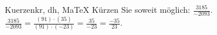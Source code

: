 \begin{MAufgabe}{Kuerzen}{kr, dh, MaTeX}
K\"urzen Sie soweit m\"oglich: $\frac{3185}{-2093}$.\\ 
\ifLsg\MLoesung
\quad $\frac{3185}{-2093}=\frac{(91)\cdot(35)}{(91)\cdot(-23)}=\frac{35}{-23}=\frac{-35}{23}$.\else\relax\fi
 \end{MAufgabe}
